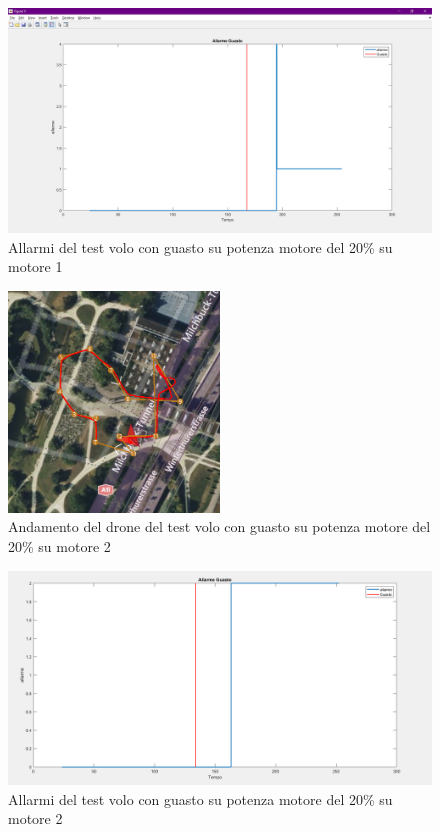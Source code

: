 \begin{figure}[H]
    \centering
    \includegraphics[width=\textwidth]{files/images/path_soglia_fissa1 (3).png}
    \caption{Allarmi del test volo con guasto su potenza motore del 20\% su motore 1}
    \label{Allarmi del test volo con guasto su potenza motore del 20\% su motore 1}
\end{figure}
\noindent

\begin{figure}[H]
    \centering
    \includegraphics[width=0.5\textwidth]{files/images/path_soglia_fissa2 (1).png}
    \caption{Andamento del drone del test volo con guasto su potenza motore del 20\% su motore 2}
    \label{Risultato volo con guasto su potenza motore del 20\% su motore 2}
\end{figure}
\noindent

\begin{figure}[H]
    \centering
    \includegraphics[width=\textwidth]{files/images/path_soglia_fissa2 (2).png}
    \caption{Allarmi del test volo con guasto su potenza motore del 20\% su motore 2}
    \label{Allarmi del test volo con guasto su potenza motore del 20\% su motore 2}
\end{figure}
\noindent

